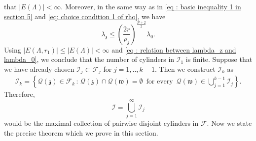 \documentclass[notitlepage,11pt,reqno]{amsart}
\theoremstyle{definition}
\numberwithin{equation}{section}
\newcommand{\mcf}{\mathcal{F}}
\newcommand{\La}{\Lambda}
\begin{document}
that $|E(\Lambda)|<\infty.$ 
Moreover, in the same way as in \eqref{eq : basic inequality 1 in section 5} and \eqref{eq: choice condition 1 of rho}, we have 
\begin{equation}    \label{eq : relation between lambda_z and lambda_0}
    \lambda_\mathfrak{z}\leq \left(\frac{2r}{\rho_\mathfrak{z}}\right)^{\frac{N+2}{2}}\lambda_0.
\end{equation}
Using $|E(\La, r_1)|\leq |E(\La)|< \infty$ and \eqref{eq : relation between lambda_z and lambda_0}, we conclude that the number of cylinders in $\mathcal{I}_1$ is finite. Suppose that we have already chosen $\mathcal{I}_j \subset \mathcal{F}_j$ for $j=1,..,k-1.$ Then we construct $\mathcal{I}_k$ as
\begin{align*}
    \mathcal{I}_k=\left\{\mathcal{Q}(\mathfrak{z})\in \mcf_k \, : \, \mathcal{Q}(\mathfrak{z})\cap \mathcal{Q}(\mathfrak{w})=\emptyset\,\,\, \text{for every}\,\,\, \mathcal{Q}(\mathfrak{w}) \in \bigcup_{j=1}^{k-1}\mathcal{I}_j \right\}. 
\end{align*}
Therefore, 
$$
\mathcal{I}=\bigcup_{j=1}^{\infty}\mathcal{I}_j
$$
would be the maximal collection of pairwise disjoint cylinders in $\mcf.$ Now we state the precise theorem which we prove in this section.
\end{document}
